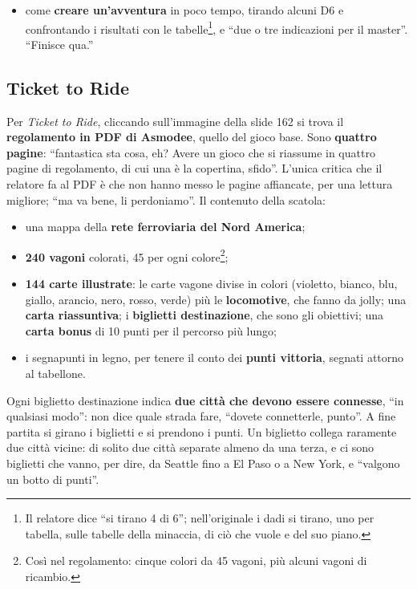 \begin{itemize}
        quel dado è un \textbf{``laser feelings''}, una sorta di risultato
        speciale\footnote{Nel regolamento originale un risultato ``Laser
        Feelings'' conta come successo e dà al personaggio un'intuizione: si può
        fare al GM una domanda a cui deve rispondere sinceramente.};
  \item come \textbf{creare un'avventura} in poco tempo, tirando alcuni D6 e
        confrontando i risultati con le tabelle\footnote{Il relatore dice ``si
        tirano 4 di 6''; nell'originale i dadi si tirano, uno per tabella, sulle
        tabelle della minaccia, di ciò che vuole e del suo piano.}, e ``due o
        tre indicazioni per il master''. ``Finisce qua.''
\end{itemize}

\subsection{Ticket to Ride}
\label{z7:subsec:ticket-to-ride}

Per \emph{Ticket to Ride}, cliccando sull'immagine della slide 162 si trova il
\textbf{regolamento in PDF di Asmodee}, quello del gioco base. Sono
\textbf{quattro pagine}: ``fantastica sta cosa, eh? Avere un gioco che si
riassume in quattro pagine di regolamento, di cui una è la copertina, sfido''.
L'unica critica che il relatore fa al PDF è che non hanno messo le pagine
affiancate, per una lettura migliore; ``ma va bene, li perdoniamo''. Il
contenuto della scatola:
\begin{itemize}
  \item una mappa della \textbf{rete ferroviaria del Nord America};
  \item \textbf{240 vagoni} colorati, 45 per ogni colore\footnote{Così nel
        regolamento: cinque colori da 45 vagoni, più alcuni vagoni di
        ricambio.};
  \item \textbf{144 carte illustrate}: le carte vagone divise in colori
        (violetto, bianco, blu, giallo, arancio, nero, rosso, verde) più le
        \textbf{locomotive}, che fanno da jolly; una \textbf{carta riassuntiva};
        i \textbf{biglietti destinazione}, che sono gli obiettivi; una
        \textbf{carta bonus} di 10 punti per il percorso più lungo;
  \item i segnapunti in legno, per tenere il conto dei \textbf{punti vittoria},
        segnati attorno al tabellone.
\end{itemize}
Ogni biglietto destinazione indica \textbf{due città che devono essere
connesse}, ``in qualsiasi modo'': non dice quale strada fare, ``dovete
connetterle, punto''. A fine partita si girano i biglietti e si prendono i
punti. Un biglietto collega raramente due città vicine: di solito due città
separate almeno da una terza, e ci sono biglietti che vanno, per dire, da
Seattle fino a El Paso o a New York, e ``valgono un botto di punti''.

